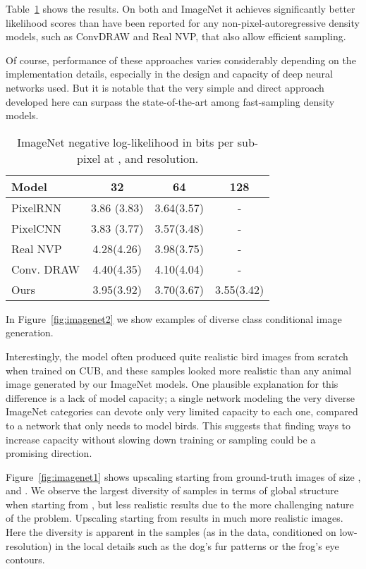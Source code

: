 \documentclass{article}
\begin{document}
Table~\ref{tab:imagenet} shows the results.
On both  and  ImageNet it achieves significantly better likelihood scores than have been reported for any non-pixel-autoregressive density models, such as ConvDRAW and Real NVP, that also allow efficient sampling.


Of course, performance of these approaches varies considerably depending on the implementation details, especially in the design and capacity of deep neural networks used.
But it is notable that the very simple and direct approach developed here can surpass the state-of-the-art among fast-sampling density models.



\begin{table}[h!]
\begin{center}
\begin{tabular}{| l | c | c | c |}
\hline
\textbf{Model} & \textbf{32} & \textbf{64} & \textbf{128} \\
\hline
\hline
PixelRNN & 3.86 (3.83) & 3.64(3.57) & - \\ \hline
PixelCNN & 3.83 (3.77) & 3.57(3.48) & - \\ \hline
\hline
Real NVP & 4.28(4.26) & 3.98(3.75) & - \\ \hline
Conv. DRAW & 4.40(4.35) & 4.10(4.04) & - \\
\hline
\hline
Ours & 3.95(3.92) & 3.70(3.67) & 3.55(3.42) \\ \hline
\end{tabular}
\end{center}
\vspace{-0.15in}
\caption{ImageNet negative log-likelihood in bits per sub-pixel at ,  and  resolution.\label{tab:imagenet}}
\end{table}


In Figure~\ref{fig:imagenet2} we show examples of diverse  class conditional image generation. 

Interestingly, the model often produced quite realistic bird images from scratch when trained on CUB, and these samples looked more realistic than any animal image generated by our ImageNet models.
One plausible explanation for this difference is a lack of model capacity; a single network modeling the  very diverse ImageNet categories can devote only very limited capacity to each one, compared to a network that only needs to model birds.
This suggests that finding ways to increase capacity without slowing down training or sampling could be a promising direction.

Figure~\ref{fig:imagenet1} shows upscaling starting from ground-truth images of size ,  and .
We observe the largest diversity of samples in terms of global structure when starting from , but less realistic results due to the more challenging nature of the problem.
Upscaling starting from  results in much more realistic images.
Here the diversity is apparent in the samples (as in the data, conditioned on low-resolution) in the local details such as the dog's fur patterns or the frog's eye contours.
\end{document}
